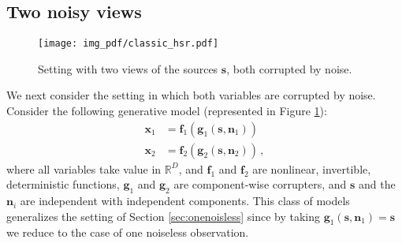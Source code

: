 
\subsection{Two noisy views}
\label{sec:constrained}

\begin{figure}[t!]
	\centering
	\texttt{[image: img\_pdf/classic\_hsr.pdf]}
	\caption{Setting with two views of the sources $\bm{s}$, both corrupted by noise.}
	\label{fig:classic_hsr}
\end{figure}

We next consider the setting in which both variables are corrupted by noise.
Consider the following generative model (represented in Figure \ref{fig:classic_hsr}):
\begin{align*}
\bm{x}_{1}&=\bm{f}_{1}(\bm{g}_{1}(\bm{s},\bm{n}_{1}))  \\
\bm{x}_{2}&=\bm{f}_{2}(\bm{g}_{2}(\bm{s},\bm{n}_{2}))  \,,
\end{align*}
where all variables take value in $\mathbb{R}^D$, and $\bm{f}_{1}$ and $\bm{f}_{2}$ are nonlinear, invertible, deterministic functions,
$\bm{g}_{1}$ and $\bm{g}_{2}$ are component-wise corrupters, and $\bm{s}$ and the $\bm{n}_i$ are independent with independent components.
This class of models generalizes the setting of Section \ref{sec:onenoisless} since by taking $\bm{g}_1(\bm{s}, \bm{n}_1) = \bm{s}$ we reduce to the case of one noiseless observation.

